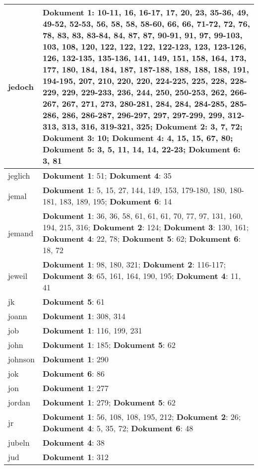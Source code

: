 \documentclass[a5paper]{article}
\begin{document}
\begin{longtable}[l]{|l|p{3in}|}
jedoch & \textbf{Dokument 1}: 10-11, 16, 16-17, 17, 20, 23, 35-36, 49, 49-52, 52-53, 56, 58, 58, 58-60, 66, 66, 71-72, 72, 76, 78, 83, 83, 83-84, 84, 87, 87, 90-91, 91, 97, 99-103, 103, 108, 120, 122, 122, 122, 122-123, 123, 123-126, 126, 132-135, 135-136, 141, 149, 151, 158, 164, 173, 177, 180, 184, 184, 187, 187-188, 188, 188, 188, 191, 194-195, 207, 210, 220, 220, 224-225, 225, 228, 228-229, 229, 229-233, 236, 244, 250, 250-253, 262, 266-267, 267, 271, 273, 280-281, 284, 284, 284-285, 285-286, 286, 286-287, 296-297, 297, 297-299, 299, 312-313, 313, 316, 319-321, 325; \textbf{Dokument 2}: 3, 7, 72; \textbf{Dokument 3}: 10; \textbf{Dokument 4}: 4, 15, 15, 67, 80; \textbf{Dokument 5}: 3, 5, 11, 14, 14, 22-23; \textbf{Dokument 6}: 3, 81 \\
\hline
jeglich & \textbf{Dokument 1}: 51; \textbf{Dokument 4}: 35 \\
\hline
jemal & \textbf{Dokument 1}: 5, 15, 27, 144, 149, 153, 179-180, 180, 180-181, 183, 189, 195; \textbf{Dokument 6}: 14 \\
\hline
jemand & \textbf{Dokument 1}: 36, 36, 58, 61, 61, 61, 70, 77, 97, 131, 160, 194, 215, 316; \textbf{Dokument 2}: 124; \textbf{Dokument 3}: 130, 161; \textbf{Dokument 4}: 22, 78; \textbf{Dokument 5}: 62; \textbf{Dokument 6}: 18, 72 \\
\hline
jeweil & \textbf{Dokument 1}: 98, 180, 321; \textbf{Dokument 2}: 116-117; \textbf{Dokument 3}: 65, 161, 164, 190, 195; \textbf{Dokument 4}: 11, 41 \\
\hline
jk & \textbf{Dokument 5}: 61 \\
\hline
joann & \textbf{Dokument 1}: 308, 314 \\
\hline
job & \textbf{Dokument 1}: 116, 199, 231 \\
\hline
john & \textbf{Dokument 1}: 185; \textbf{Dokument 5}: 62 \\
\hline
johnson & \textbf{Dokument 1}: 290 \\
\hline
jok & \textbf{Dokument 6}: 86 \\
\hline
jon & \textbf{Dokument 1}: 277 \\
\hline
jordan & \textbf{Dokument 1}: 279; \textbf{Dokument 5}: 62 \\
\hline
jr & \textbf{Dokument 1}: 56, 108, 108, 195, 212; \textbf{Dokument 2}: 26; \textbf{Dokument 4}: 5, 35, 72; \textbf{Dokument 6}: 48 \\
\hline
jubeln & \textbf{Dokument 4}: 38 \\
\hline
jud & \textbf{Dokument 1}: 312 \\

\end{longtable}
\end{document}
